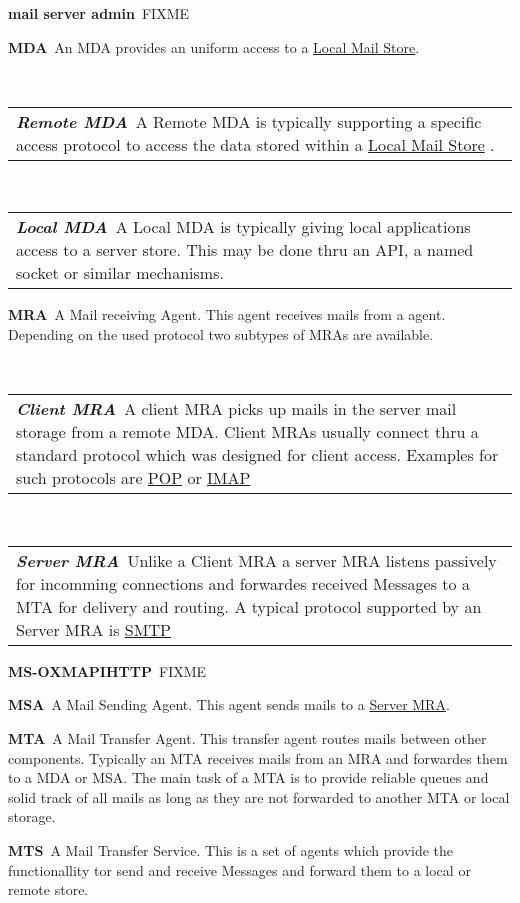 \documentclass[10pt,a4paper,appendixprefix,pdfusetitle,twocolumn,draft]{scrbook}
\makeatletter
\newenvironment{entry}{\par\leavevmode\hangpara{1.5mm}{1}\ignorespaces}{\RaggedRight\par}
\newcommand*{\mainentry}[2]{{\bfseries{#1\label{def:#1}}}~#2\par}
\newcommand*{\subentry}[2]{\par~\begin{tabular}{p{\textwidth-.6cm}@{}}{\bfseries{\itshape{#1\label{def:#1}}}}~#2\end{tabular}}
\newcommand*{\defref}[1]{\hyperref[def:#1]{#1}}
\makeatother
\begin{document}
\begin{entry}
  \mainentry{mail server admin}{FIXME}
\end{entry}

\begin{entry}
  \mainentry{MDA}{An MDA provides an uniform access to a \defref{Local Mail Store}.}
  \subentry{Remote MDA}{A Remote MDA is typically supporting a specific access protocol to access the data stored within a \defref{Local Mail Store} .}
  \subentry{Local MDA}{A Local MDA is typically giving local applications access to a server store. This may be done thru an API, a named socket or similar mechanisms.}
\end{entry}

\begin{entry}
  \mainentry{MRA}{A Mail receiving Agent. This agent receives mails from a agent. Depending on the used protocol two subtypes of MRAs are available.}
  \subentry{Client MRA}{A client MRA picks up mails in the server mail storage from a remote MDA. Client MRAs usually connect thru a standard protocol which was designed for client access. Examples for such protocols are \defref{POP} or \defref{IMAP}}
  \subentry{Server MRA}{Unlike a Client MRA a server MRA listens passively for incomming connections and forwardes received Messages to a MTA for delivery and routing. A typical protocol supported by an Server MRA is \defref{SMTP}}
\end{entry}

\begin{entry}
  \mainentry{MS-OXMAPIHTTP}{FIXME}
\end{entry}

\begin{entry}
  \mainentry{MSA}{A Mail Sending Agent. This agent sends mails to a \defref{Server MRA}. }
\end{entry}

\begin{entry}
  \mainentry{MTA}{A Mail Transfer Agent. This transfer agent routes mails between other components. Typically  an MTA receives mails from an MRA and forwardes them to a MDA or MSA. The main task of a MTA is to provide reliable queues and solid track of all mails as long as they are not forwarded to another MTA or local storage.}
\end{entry}

\begin{entry}
  \mainentry{MTS}{A Mail Transfer Service. This is a set of agents which provide the functionallity tor send and receive Messages and forward them to a local or remote store.}
\end{entry}
\end{document}
